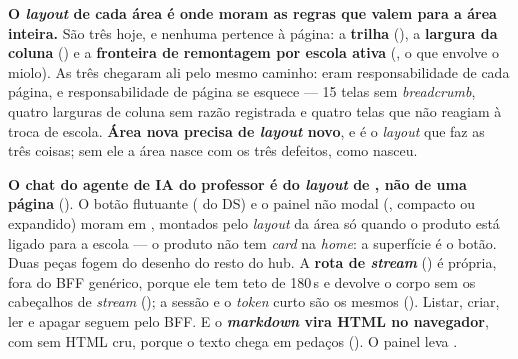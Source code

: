 \begin{decisao}
\textbf{O \emph{layout} de cada área é onde moram as regras que valem para a área
inteira.} São três hoje, e nenhuma pertence à página: a \textbf{trilha}
(), a \textbf{largura da coluna} () e a
\textbf{fronteira de remontagem por escola ativa} (, o
 que envolve o miolo). As três chegaram ali pelo mesmo
caminho: eram responsabilidade de cada página, e responsabilidade de página se
esquece --- 15 telas sem \emph{breadcrumb}, quatro larguras de coluna sem razão
registrada e quatro telas que não reagiam à troca de escola. \textbf{Área nova
precisa de \emph{layout} novo}, e é o \emph{layout} que faz as três coisas; sem
ele a área nasce com os três defeitos, como  nasceu.
\end{decisao}

\begin{decisao}
\textbf{O chat do agente de IA do professor é do \emph{layout} de
, não de uma página} (). O botão flutuante
( do DS) e o painel não modal (, compacto ou
expandido) moram em , montados pelo
\emph{layout} da área só quando o produto  está ligado
para a escola --- o produto não tem \emph{card} na \emph{home}: a superfície é o
botão. Duas peças fogem do desenho do resto do hub. A \textbf{rota de
\emph{stream}} () é própria, fora do
BFF genérico, porque ele tem teto de 180\,s e devolve o corpo sem os cabeçalhos
de \emph{stream} (); a sessão e o \emph{token} curto são os mesmos
(). Listar, criar, ler e apagar seguem pelo BFF. E o \textbf{\emph{markdown} vira HTML no navegador}, com
 sem HTML cru, porque o texto chega em pedaços
(). O painel leva .
\end{decisao}

